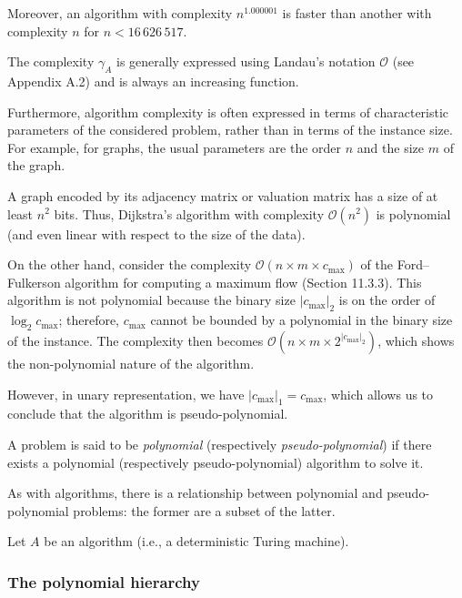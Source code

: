 Moreover, an algorithm with complexity $n^{1.000001}$ is faster than another with complexity $n$ for $n < 16\,626\,517$.

The complexity $\gamma_A$ is generally expressed using Landau’s notation $\mathcal{O}$ (see Appendix A.2) and is always an increasing function.

Furthermore, algorithm complexity is often expressed in terms of characteristic parameters of the considered problem, rather than in terms of the instance size. For example, for graphs, the usual parameters are the order $n$ and the size $m$ of the graph.

A graph encoded by its adjacency matrix or valuation matrix has a size of at least $n^2$ bits. Thus, Dijkstra's algorithm with complexity $\mathcal{O}(n^2)$ is polynomial (and even linear with respect to the size of the data).

On the other hand, consider the complexity $\mathcal{O}(n \times m \times c_{\max})$ of the Ford–Fulkerson algorithm for computing a maximum flow (Section 11.3.3). This algorithm is not polynomial because the binary size $|c_{\max}|_2$ is on the order of $\log_2 c_{\max}$; therefore, $c_{\max}$ cannot be bounded by a polynomial in the binary size of the instance. The complexity then becomes $\mathcal{O}(n \times m \times 2^{|c_{\max}|_2})$, which shows the non-polynomial nature of the algorithm.

However, in unary representation, we have $|c_{\max}|_1 = c_{\max}$, which allows us to conclude that the algorithm is pseudo-polynomial.

\begin{definition}
    A problem is said to be \textit{polynomial} (respectively \textit{pseudo-polynomial}) if there exists a polynomial (respectively pseudo-polynomial) algorithm to solve it.
\end{definition}

As with algorithms, there is a relationship between polynomial and pseudo-polynomial problems: the former are a subset of the latter.


\begin{definition}
    Let $A$ be an algorithm (i.e., a deterministic Turing machine). 
\end{definition}

\subsubsection{The polynomial hierarchy}

